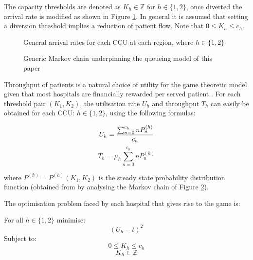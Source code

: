 \documentclass[a4paper,11pt]{article}
\begin{document}
The capacity thresholds are denoted as $K_{h}\in\mathbb{Z}$ for $h\in\{1,2\}$, once diverted the arrival rate is modified as shown in Figure \ref{arrivalrateregions}.
In general it is assumed that setting a diversion threshold implies a reduction of patient flow.
Note that $0\leq K_h\leq c_h$.

\begin{figure}[!htbp]
\begin{center}
\caption{General arrival rates for each CCU at each region, where $h\in\{1, 2\}$} \label{arrivalrateregions}
\end{center}
\end{figure}

\begin{figure}[!htbp]
\begin{center}

\caption{Generic Markov chain underpinning the queueing model of this paper} \label{mc}
\end{center}
\end{figure}

Throughput of patients is a natural choice of utility for the game theoretic model given that most hospitals are financially rewarded per served patient \cite{Pate2009}.
For each threshold pair $(K_{1},K_{2})$, the utilisation rate $U_h$ and throughput $T_h$ can easily be obtained for each CCU: $h\in\{\text{1},\text{2}\}$, using the following formulas:

$$U_{h}={{\sum_{n=0}^{c_h} nP^{(h)}_n}\over{c_{h}}}$$
$$T_{h}=\mu_h \sum _{n=0}^{c_h} nP^{(h)}_n$$

where $P^{(h)}=P^{(h)}(K_{1},K_{2})$ is the steady state probability distribution function (obtained from by analysing the Markov chain of Figure \ref{mc}).

The optimisation problem faced by each hospital that gives rise to the game is:

For all $h\in\{\text{1}, \text{2}\}$ minimise:
\begin{equation}\left(U_{h}-t\right)^2\end{equation}
Subject to:
\begin{equation}
0\leq K_h \leq c_{h}
\end{equation}
\begin{equation}
K_h \in  \mathbb{Z}
\end{equation}
\end{document}

